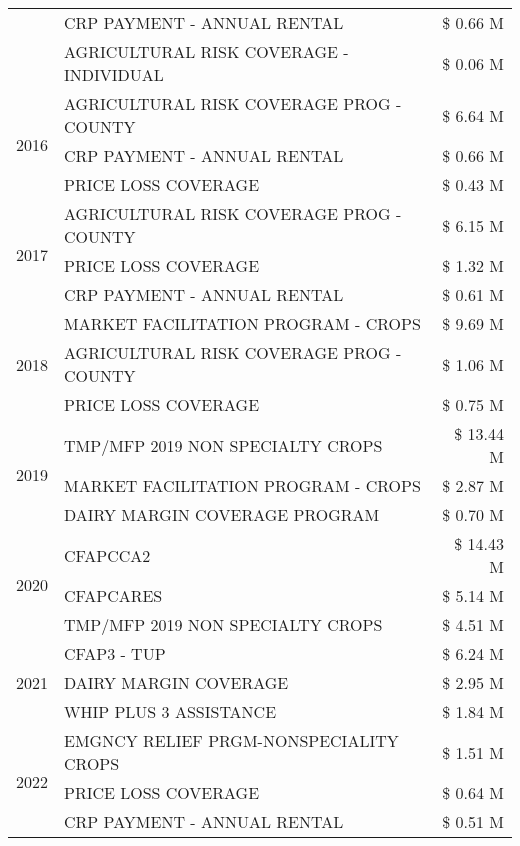 \begin{tabular}{llr}
 & CRP PAYMENT - ANNUAL RENTAL & \$ 0.66 M \\
 & AGRICULTURAL RISK COVERAGE - INDIVIDUAL & \$ 0.06 M \\
\cline{1-3}
\multirow[t]{3}{*}{2016} & AGRICULTURAL RISK COVERAGE PROG - COUNTY & \$ 6.64 M \\
 & CRP PAYMENT - ANNUAL RENTAL & \$ 0.66 M \\
 & PRICE LOSS COVERAGE & \$ 0.43 M \\
\cline{1-3}
\multirow[t]{3}{*}{2017} & AGRICULTURAL RISK COVERAGE PROG - COUNTY & \$ 6.15 M \\
 & PRICE LOSS COVERAGE & \$ 1.32 M \\
 & CRP PAYMENT - ANNUAL RENTAL & \$ 0.61 M \\
\cline{1-3}
\multirow[t]{3}{*}{2018} & MARKET FACILITATION PROGRAM - CROPS & \$ 9.69 M \\
 & AGRICULTURAL RISK COVERAGE PROG - COUNTY & \$ 1.06 M \\
 & PRICE LOSS COVERAGE & \$ 0.75 M \\
\cline{1-3}
\multirow[t]{3}{*}{2019} & TMP/MFP 2019 NON SPECIALTY CROPS & \$ 13.44 M \\
 & MARKET FACILITATION PROGRAM - CROPS & \$ 2.87 M \\
 & DAIRY MARGIN COVERAGE PROGRAM & \$ 0.70 M \\
\cline{1-3}
\multirow[t]{3}{*}{2020} & CFAPCCA2 & \$ 14.43 M \\
 & CFAPCARES & \$ 5.14 M \\
 & TMP/MFP 2019 NON SPECIALTY CROPS & \$ 4.51 M \\
\cline{1-3}
\multirow[t]{3}{*}{2021} & CFAP3 - TUP & \$ 6.24 M \\
 & DAIRY MARGIN COVERAGE & \$ 2.95 M \\
 & WHIP PLUS 3 ASSISTANCE & \$ 1.84 M \\
\cline{1-3}
\multirow[t]{3}{*}{2022} & EMGNCY RELIEF PRGM-NONSPECIALITY CROPS & \$ 1.51 M \\
 & PRICE LOSS COVERAGE & \$ 0.64 M \\
 & CRP PAYMENT - ANNUAL RENTAL & \$ 0.51 M \\
\cline{1-3}
\bottomrule
\end{tabular}

